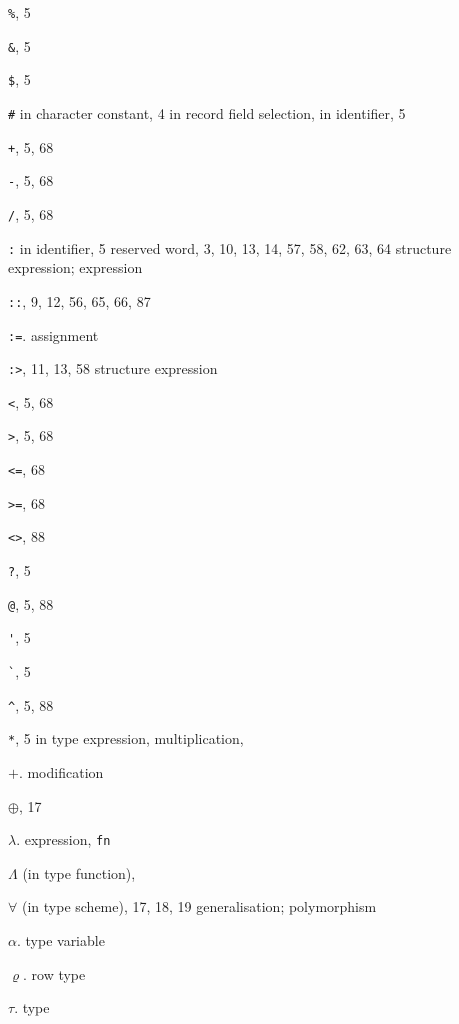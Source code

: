 \begin{theindex}
\item \verb+%+, 5
\item \verb+&+, 5
\item \verb+$+, 5
\item \verb+#+
\subitem in character constant, 4
\subitem in record field selection, \hashrefs
\subitem in identifier, 5
\item \verb(+(, 5, 68
\item \verb+-+, 5, 68
\item \verb+/+, 5, 68
\item \verb+:+
\subitem in identifier, 5
\subitem reserved word, 3, 10, 13, 14, 57, 58, 62, 63, 64
\subitem \seealso structure expression; expression
\item \verb+::+, 9, 12, 56, 65, 66, 87
\item \verb+:=+. \see assignment
\item \verb+:>+, 11, 13, 58
\subitem \seealso structure expression
\item \verb+<+, 5, 68
\item \verb+>+, 5, 68
\item \verb+<=+, 68
\item \verb+>=+, 68
\item \verb+<>+, 88
\item \verb+?+, 5
\item \verb+@+, 5, 88
\item \verb+'+, 5
\item \verb+`+, 5
\item \verb+^+, 5, 88
\item \verb+*+, 5
\subitem in type expression, \startyperefs
\subitem multiplication, \mulrefs
\item $+$. \see modification
\item $\oplus$, 17
\item $\lambda$. \see expression, {\tt fn}
\item $\Lambda$ (in type function), \Lambdarefs
\item $\forall$ (in type scheme), 17, 18, 19
\subitem \seealso generalisation; polymorphism
\item $\alpha$. \see type variable
\item $\varrho$. \see row type

\item $\tau$. \see type


\end{theindex}
